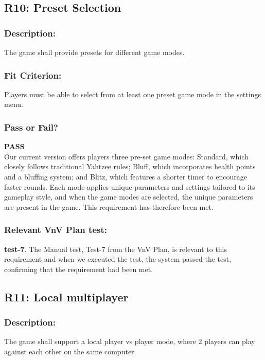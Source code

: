 \documentclass[12pt, titlepage]{article}
\begin{document}
\subsection{R10: Preset Selection} 

\subsubsection{Description:}The game shall provide presets for different game modes.

\subsubsection{Fit Criterion:}Players must be able to select from at least one preset game mode in the settings menu.

\subsubsection{Pass or Fail?} 

 \noindent \textbf{PASS}\\
 
 \noindent Our current version offers players three pre-set game modes: Standard, which closely follows traditional Yahtzee rules; Bluff, which incorporates health points and a bluffing system; and Blitz, which features a shorter timer to encourage faster rounds. Each mode applies unique parameters and settings tailored to its gameplay style, and when the game modes are selected, the unique parameters are present in the game. This requirement has therefore been met.

\subsubsection{Relevant VnV Plan test: } \textbf{test-7}.  The Manual test, Test-7 from the VnV Plan, is relevant to this requirement and when we executed the test, the system passed the test, confirming that the requirement had been met.

\subsection{R11: Local multiplayer} 

\subsubsection{Description:}The game shall support a local player vs player mode, where 2 players can play against each other on the same computer.
\end{document}
